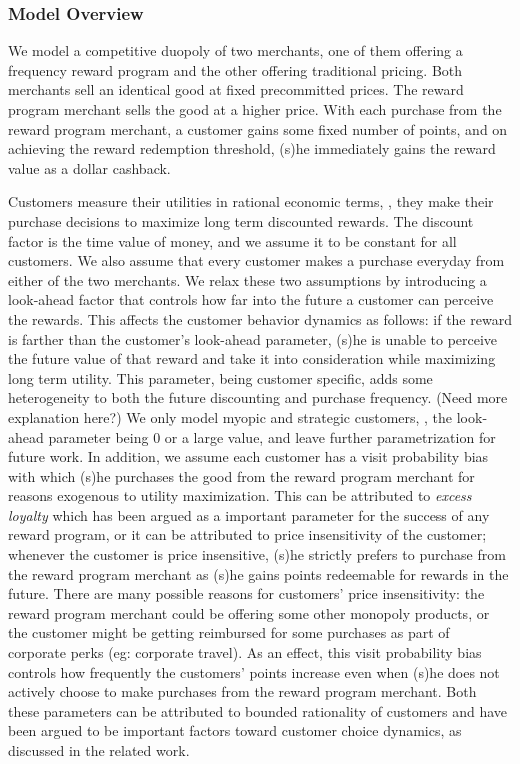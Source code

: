 \subsubsection{Model Overview}
We model a competitive duopoly of two merchants, one of them offering a frequency reward program and the other offering traditional pricing.
Both merchants sell an identical good at fixed precommitted prices.
The reward program merchant sells the good at a higher price.
With each purchase from the reward program merchant, a customer gains some fixed number of points, and on achieving the reward redemption threshold, (s)he immediately gains the reward value as a dollar cashback.

Customers measure their utilities in rational economic terms, \ie, they make their purchase decisions to maximize long term discounted rewards.
The discount factor is the time value of money, and we assume it to be constant for all customers.
We also assume that every customer makes a purchase everyday from either of the two merchants.
We relax these two assumptions by introducing a look-ahead factor that controls how far into the future a customer can perceive the rewards. 
This affects the customer behavior dynamics as follows: if the reward is farther than the customer's look-ahead parameter, (s)he is unable to perceive the future value of that reward and take it into consideration while maximizing long term utility.
{\arpit This parameter, being customer specific, adds some heterogeneity to both the future discounting and purchase frequency. (Need more explanation here?)}
We only model myopic and strategic customers, \ie, the look-ahead parameter being $0$ or a large value, and leave further parametrization for future work.
In addition, we assume each customer has a visit probability bias with which (s)he purchases the good from the reward program merchant for reasons exogenous to utility maximization.
This can be attributed to \emph{excess loyalty} which has been argued as a important parameter for the success of any reward program, or it can be attributed to price insensitivity of the customer; whenever the customer is price insensitive, (s)he strictly prefers to purchase from the reward program merchant as (s)he gains points redeemable for rewards in the future.
There are many possible reasons for customers' price insensitivity: the reward program merchant could be offering some other monopoly products, or the customer might be getting reimbursed for some purchases as part of corporate perks (eg: corporate travel).
As an effect, this visit probability bias controls how frequently the customers' points increase even when (s)he does not actively choose to make purchases from the reward program merchant.
Both these parameters can be attributed to bounded rationality of customers and have been argued to be important factors toward customer choice dynamics, as discussed in the related work.


